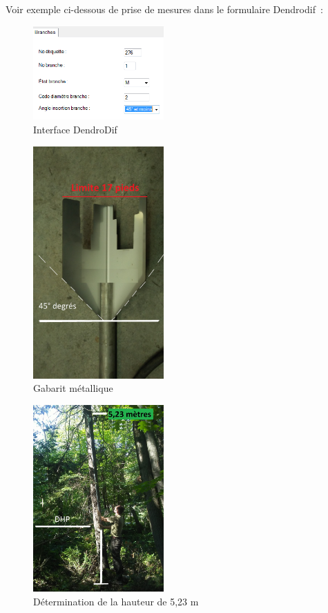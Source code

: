 \documentclass[letterpaper, 12pt]{article}
\begin{document}
\begin{onehalfspace}
\begin{enumerate}
\end{enumerate}

\vspace{12pt}
 
Voir exemple ci-dessous de prise de mesures dans le formulaire Dendrodif :

\begin{figure}[H]
	\centering
	\includegraphics[width=5cm]{Figure3}
	\caption{Interface DendroDif}
\end{figure}

\begin{figure}[H]
	\centering
	\includegraphics[width=5cm]{Figure4}
	\caption{Gabarit métallique}
\end{figure}

\begin{figure}[H]
	\centering
	\includegraphics[width=5cm]{Figure5}
	\caption{Détermination de la hauteur de 5,23 m}
\end{figure}


\end{onehalfspace}
\end{document}

